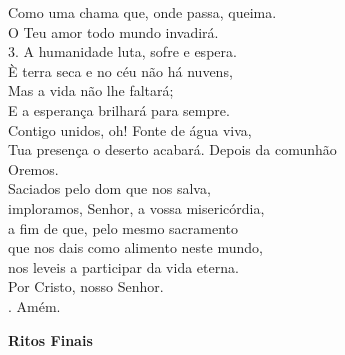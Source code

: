 \documentclass{book}
\begin{document}
\begin{flushleft}
    Como uma chama que, onde passa, queima. \\
    O Teu amor todo mundo invadirá. \\
    3. A humanidade luta, sofre e espera. \\
    È terra seca e no céu não há nuvens, \\
    Mas a vida não lhe faltará; \\
    E a esperança brilhará para sempre. \\
    Contigo unidos, oh! Fonte de água viva, \\
    Tua presença o deserto acabará.
    \newpage
    \textcolor{VioletRed2}{Depois da comunhão}
    \vspace{.2cm} \\
    Oremos.
    \vspace{.2cm} \\
    Saciados pelo dom que nos salva, \\
    imploramos, Senhor, a vossa misericórdia, \\
    a fim de que, pelo mesmo sacramento \\
    que nos dais como alimento neste mundo, \\
    nos leveis a participar da vida eterna. \\
    Por Cristo, nosso Senhor.
    \vspace{.2cm} \\
    {\color{VioletRed2} \Rbar.} Amém.
\end{flushleft}
\begin{center}
    \textbf{Ritos Finais}
\end{center}
\end{document}
